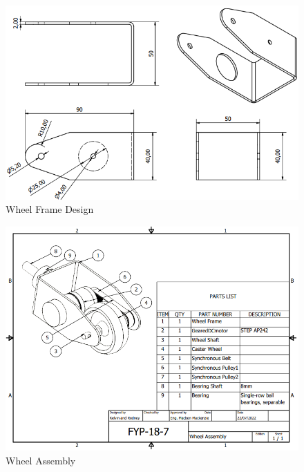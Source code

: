 \begin{figure}[H]
    \centering
    \includegraphics[scale =0.8]{Figures/NewFrameDWG.png}
    \caption{Wheel Frame Design}
    \label{fig:newframe}
\end{figure}

\begin{figure}[H]
    \centering
    \includegraphics[scale = 0.8]{Figures/WheelAssembly.png}
    \caption{Wheel Assembly}
    \label{fig:wheelassembly}
\end{figure}

